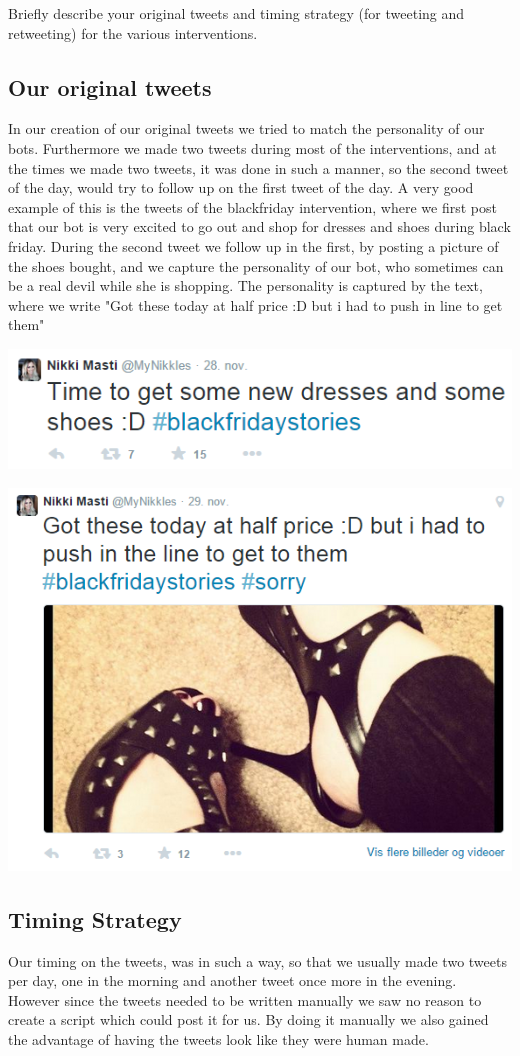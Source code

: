 Briefly describe your original tweets and timing strategy (for tweeting and retweeting) for the various interventions.\\

\subsection{Our original tweets}
In our creation of our original tweets we tried to  match the personality of our bots. Furthermore we made two tweets during most of the interventions, and at the times we made two tweets, it was done in such a manner, so the second tweet of the day, would try to follow up on the first tweet of the day. A very good example of this is the tweets of the blackfriday intervention, where we first post that our bot is very excited to go out and shop for dresses and shoes during black friday. During the second tweet we follow up in the first, by posting a picture of the shoes bought, and we capture the personality of our bot, who sometimes can be a real devil while she is shopping. The personality is captured by the text, where we write "Got these today at half price :D but i had to push in line to get them" 

\includegraphics[scale=0.5]{intervention_blackfriday}

\includegraphics[scale=0.5]{intervention_blackfriday2}

\subsection{Timing Strategy}
Our timing on the tweets, was in such a way, so that we usually made two tweets per day, one in the morning and another tweet once more in the evening. However since the tweets needed to be written manually we saw no reason to create a script which could post it for us. By doing it manually we also gained the advantage of having the tweets look like they were human made.
